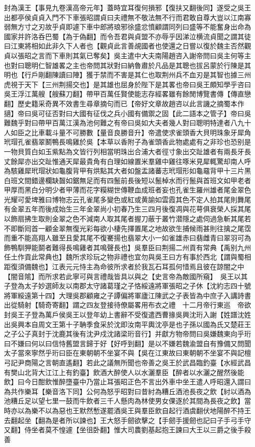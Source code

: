 封為漢王【事見九卷漢高帝元年】蓋時宜耳復何損邪【復扶又翻後同】遂受之吳王出都亭侯貞貞入門不下車張昭謂貞曰夫禮無不敬法無不行而君敢自尊大豈以江南寡弱無方寸之刃故乎貞即遽下車中郎將琅邪徐盛忿憤顧謂同列曰盛等不能奮身出命為國家并許洛呑巴蜀【為于偽翻】而令吾君與貞盟不亦辱乎因涕泣横流貞聞之謂其徒曰江東將相如此非久下人者也【觀貞此言善覘國者也使還之日嘗以復於魏主否然觀貞以張昭之言而下車則其氣已奪矣】吳主遣中大夫南陽趙咨入謝帝問曰吳主何等主也對曰聰明仁智雄畧之主也帝問其狀對曰納魯肅於凡品是其聰也拔呂蒙於行陳是其明也【行戶剛翻陳讀曰陣】獲于禁而不害是其仁也取荆州兵不血刃是其智也據三州虎視于天下【三州荆揚交也】是其雄也屈身於陛下是其畧也帝曰吳王頗知學乎咨曰吳王浮江萬艘【艘蘇刀翻】帶甲百萬任賢使能志存經畧雖有餘閒博覽書傳【傳直戀翻】歷史籍采奇異不效書生尋章摘句而已【帝好文章故趙咨以此言譏之摘蜀本作擿】帝曰吳可征否對曰大國有征伐之兵小國有備禦之固【此二語本之管子】帝曰吳難魏乎對曰帶甲百萬江漢為池何難之有帝曰吳如大夫者幾人對曰聰明特達者八九十人如臣之比車載斗量不可勝數【量音良勝音升】帝遣使求雀頭香大貝明珠象牙犀角玳瑁孔雀翡翠鬭鴨長鳴雞於吳【本草以香附子為雀頭香此物處處有之非珍也恐别是一物貝質白如玉紫點為文皆行列相當明珠出合浦大者徑寸象出交趾雄者有兩長牙長丈餘犀亦出交趾惟通天犀最貴角有白理如線置米羣雞中雞往啄米見犀輒驚却南人呼為駭雞犀玳瑁狀如龜腹背甲有烘點其大者如盤盂諸蕃志玳瑁形如龜黿背甲十三片黑白班文間錯邊欄缺齧如鋸無足而有四鬛前長後短以鬛棹水而行鬛與首班文如甲老者甲厚而黑白分明少者甲薄而花字糢糊世傳鞭血成班者妄也孔雀生羅州雄者尾金翠色光耀可愛埤雅曰博物志云孔雀尾多變色或紅或黄諭如雲霞其色不定人拍其尾則舞尾有金翠五年而後成始生三年金翠尚小初春乃生三四月後復凋與花萼俱衰榮人採其尾以飾扇拂生取則金翠之色不減南人取其尾者握刀蔽于叢竹潜隱之處伺過急斬其尾若不即斷囘首一顧金翠無復光彩每欲小棲先擇置尾之地故欲生捕候雨甚則往擒之尾霑而重不能高翔人雖至且愛其尾不復騫揚也翡翠大小一如雀雄赤曰翡雌青曰翠羽可為飾鴨馴狎能鬬者難得長鳴雞者其鳴聲長也】吳羣臣曰荆揚二州貢有常典【禹别九州任土作貢此常典也】魏所求珍玩之物非禮也宜勿與吳王曰方有事於西北【謂與蜀相距復須備魏也】江表元元恃主為命彼所求者於我瓦石耳孤何惜焉且彼在諒闇之中【闇音隂】而所求若此寧可與言禮哉皆具以與之【史言帝為敵國所窺】　吳王以其子登為太子妙選師友以南郡太守諸葛瑾之子恪綏遠將軍張昭之子休【沈約志四十號將軍綏遠第十四】大理吳郡顧雍之子譚偏將軍廬江陳武之子表皆為中庶子入講詩書出從騎射【騎奇寄翻】謂之四友登接待僚屬畧用布衣之禮　十二月帝行東巡　帝欲封吳王子登為萬戶侯吳王以登年幼上書辭不受復遣西曹掾吳興沈珩入謝【姓譜沈姓出吳興本自周文王第十子聃季食采於沈即汝南平輿沈亭是也子孫以國為氏又楚莊王之子公子真封于沈鹿其後有沈尹戍沈諸梁珩音行】并獻方物帝問曰吳嫌魏東向乎珩曰不嫌曰何以曰信恃舊盟言歸于好【好呼到翻】是以不嫌若魏渝盟自有豫備又問聞太子當來寧然乎珩曰臣在東朝朝不坐宴不與【吳在江東故曰東朝朝不坐宴不與記檀弓記尹商陽之言朝直遙翻】若此之議無所聞也帝善之吳王於武昌臨釣臺【水經武昌有樊山北背大江江上有釣臺】飲酒大醉使人以水灑羣臣【醉者以水灑之醒然後能飲】曰今日酣飲惟醉墮臺中乃當止耳張昭正色不言出外車中坐王遣人呼昭還入謂曰為共作樂耳【樂音洛下同】公何為怒乎昭對曰昔紂為糟丘酒池長夜之飲【紂以酒為池糟丘足以望七里一鼓而牛飲者三千人懸肉為林使男女倮逐於其間為長夜之飲】當時亦以為樂不以為惡也王默然慙遂罷酒吳王與羣臣飲自起行酒虞翻伏地陽醉不持王去翻起坐【翻為是者所以諫也】王大怒手劒欲擊之【手劒手援劒也記曰子手弓手守又翻】侍坐者莫不惶遽【坐徂卧翻】惟大司農劉基起抱王諫曰大王以三爵之後手殺善